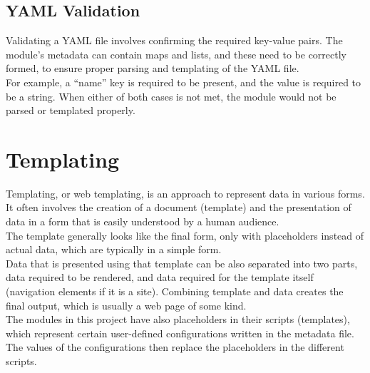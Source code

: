 \subsection{YAML Validation}
Validating a YAML file involves confirming the required key-value pairs. The module’s metadata can contain maps and lists, and these need to be correctly formed, to ensure proper parsing and templating of the YAML file.\\
For example, a “name” key is required to be present, and the value is required to be a string. When either of both cases is not met, the module would not be parsed or templated properly.


\section{Templating}
Templating, or web templating, is an approach to represent data in various forms. It often involves the creation of a document (template) and the presentation of data in a form that is easily understood by a human audience.\\
The template generally looks like the final form, only with placeholders instead of actual data, which are typically in a simple form.\\
Data that is presented using that template can be also separated into two parts, data required to be rendered, and data required for the template itself (navigation elements if it is a site). Combining template and data creates the final output, which is usually a web page of some kind\cite{templating}.\\
The modules in this project have also placeholders in their scripts (templates), which represent certain user-defined configurations written in the metadata file. The values of the configurations then replace the placeholders in the different scripts.\\
